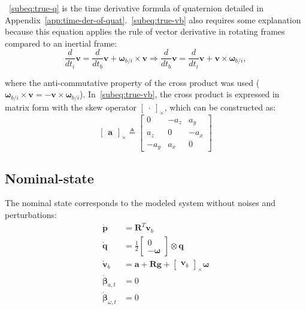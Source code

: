 ~\eqref{subeq:true-q} is the time derivative formula of quaternion detailed in Appendix~\ref{app:time-der-of-quat}.~\eqref{subeq:true-vb} also requires some explanation because this equation applies the rule of vector derivative in rotating frames compared to an inertial frame:
\begin{equation}
    \frac{d}{dt_i}\mathbf{v}=\frac{d}{dt_b}\mathbf{v}+\boldsymbol{\omega}_{b/i}\times\mathbf{v}\Rightarrow\frac{d}{dt_b}\mathbf{v}=\frac{d}{dt_i}\mathbf{v}+\mathbf{v}\times\boldsymbol{\omega}_{b/i},
\end{equation}

where the anti-commutative property of the cross product was used ($\boldsymbol{\omega}_{b/i}\times\mathbf{v}=-\mathbf{v}\times\boldsymbol{\omega}_{b/i}$). In~\eqref{subeq:true-vb}, the cross product is expressed in matrix form with the skew operator $\begin{bmatrix}. \end{bmatrix}_{\times}$, which can be constructed as:
\begin{equation}
    \begin{bmatrix}\mathbf{a} \end{bmatrix}_{\times}\triangleq\begin{bmatrix}
        0 & -a_z & a_y \\
        a_z & 0 & -a_x \\
        -a_y & a_x & 0
    \end{bmatrix}
\end{equation}

\subsection*{Nominal-state}

The nominal state corresponds to the modeled system without noises and perturbations:
 \begin{subequations}
    \begin{align}
        \dot{\mathbf{p}} &= \mathbf{R}^T\mathbf{v}_{b} \\
        \dot{\mathbf{q}} &= \frac{1}{2}\begin{bmatrix}0\\ -\boldsymbol{\omega}\end{bmatrix} \otimes \mathbf{q} \\
        \dot{\mathbf{v}}_{b}&=\mathbf{a}+\mathbf{R}\mathbf{g} + \begin{bmatrix}\mathbf{v}_{b} \end{bmatrix}_{\times}\boldsymbol{\omega} \label{subeq:nom-vb}\\
        \dot{\boldsymbol{\beta}}_{a,t}&=0 \label{subeq:nom-ba}\\
        \dot{\boldsymbol{\beta}}_{\omega,t}&=0 \label{subeq:nom-bw}
    \end{align}\label{eq:nominal-state}
\end{subequations}

